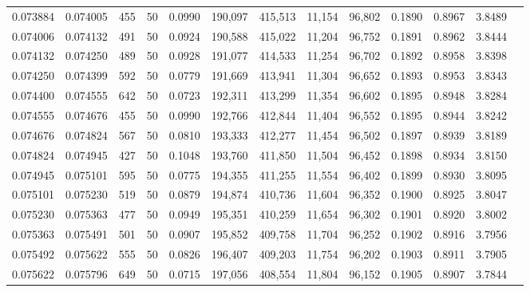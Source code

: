\begin{tabular}{rrrrrrrrrrrrr}
0.073884 & 0.074005 &   455 &  50 &                                     0.0990 & 190,097 & 415,513 &  11,154 &  96,802 & 0.1890 & 0.8967 & 3.8489 \\
0.074006 & 0.074132 &   491 &  50 &                                     0.0924 & 190,588 & 415,022 &  11,204 &  96,752 & 0.1891 & 0.8962 & 3.8444 \\
0.074132 & 0.074250 &   489 &  50 &                                     0.0928 & 191,077 & 414,533 &  11,254 &  96,702 & 0.1892 & 0.8958 & 3.8398 \\
0.074250 & 0.074399 &   592 &  50 &                                     0.0779 & 191,669 & 413,941 &  11,304 &  96,652 & 0.1893 & 0.8953 & 3.8343 \\
0.074400 & 0.074555 &   642 &  50 &                                     0.0723 & 192,311 & 413,299 &  11,354 &  96,602 & 0.1895 & 0.8948 & 3.8284 \\
0.074555 & 0.074676 &   455 &  50 &                                     0.0990 & 192,766 & 412,844 &  11,404 &  96,552 & 0.1895 & 0.8944 & 3.8242 \\
0.074676 & 0.074824 &   567 &  50 &                                     0.0810 & 193,333 & 412,277 &  11,454 &  96,502 & 0.1897 & 0.8939 & 3.8189 \\
0.074824 & 0.074945 &   427 &  50 &                                     0.1048 & 193,760 & 411,850 &  11,504 &  96,452 & 0.1898 & 0.8934 & 3.8150 \\
0.074945 & 0.075101 &   595 &  50 &                                     0.0775 & 194,355 & 411,255 &  11,554 &  96,402 & 0.1899 & 0.8930 & 3.8095 \\
0.075101 & 0.075230 &   519 &  50 &                                     0.0879 & 194,874 & 410,736 &  11,604 &  96,352 & 0.1900 & 0.8925 & 3.8047 \\
0.075230 & 0.075363 &   477 &  50 &                                     0.0949 & 195,351 & 410,259 &  11,654 &  96,302 & 0.1901 & 0.8920 & 3.8002 \\
0.075363 & 0.075491 &   501 &  50 &                                     0.0907 & 195,852 & 409,758 &  11,704 &  96,252 & 0.1902 & 0.8916 & 3.7956 \\
0.075492 & 0.075622 &   555 &  50 &                                     0.0826 & 196,407 & 409,203 &  11,754 &  96,202 & 0.1903 & 0.8911 & 3.7905 \\
0.075622 & 0.075796 &   649 &  50 &                                     0.0715 & 197,056 & 408,554 &  11,804 &  96,152 & 0.1905 & 0.8907 & 3.7844 \\

\end{tabular}
